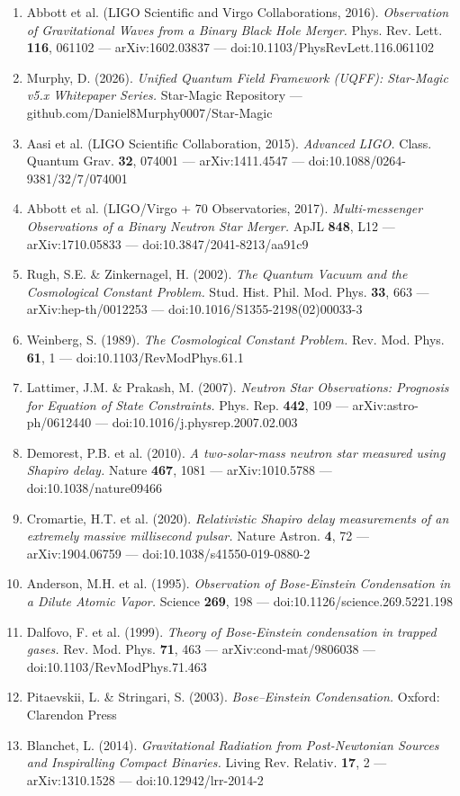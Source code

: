 \documentclass[11pt]{article}
\begin{document}
\begin{enumerate}
  \item Abbott et al. (LIGO Scientific and Virgo Collaborations, 2016). \emph{Observation of Gravitational Waves from a Binary Black Hole Merger.} Phys. Rev. Lett. \textbf{116}, 061102 --- arXiv:1602.03837 --- doi:10.1103/PhysRevLett.116.061102
  \item Murphy, D. (2026). \emph{Unified Quantum Field Framework (UQFF): Star-Magic v5.x Whitepaper Series.} Star-Magic Repository --- github.com/Daniel8Murphy0007/Star-Magic
  \item Aasi et al. (LIGO Scientific Collaboration, 2015). \emph{Advanced LIGO.} Class. Quantum Grav. \textbf{32}, 074001 --- arXiv:1411.4547 --- doi:10.1088/0264-9381/32/7/074001
  \item Abbott et al. (LIGO/Virgo + 70 Observatories, 2017). \emph{Multi-messenger Observations of a Binary Neutron Star Merger.} ApJL \textbf{848}, L12 --- arXiv:1710.05833 --- doi:10.3847/2041-8213/aa91c9
  \item Rugh, S.E. \& Zinkernagel, H. (2002). \emph{The Quantum Vacuum and the Cosmological Constant Problem.} Stud. Hist. Phil. Mod. Phys. \textbf{33}, 663 --- arXiv:hep-th/0012253 --- doi:10.1016/S1355-2198(02)00033-3
  \item Weinberg, S. (1989). \emph{The Cosmological Constant Problem.} Rev. Mod. Phys. \textbf{61}, 1 --- doi:10.1103/RevModPhys.61.1
  \item Lattimer, J.M. \& Prakash, M. (2007). \emph{Neutron Star Observations: Prognosis for Equation of State Constraints.} Phys. Rep. \textbf{442}, 109 --- arXiv:astro-ph/0612440 --- doi:10.1016/j.physrep.2007.02.003
  \item Demorest, P.B. et al. (2010). \emph{A two-solar-mass neutron star measured using Shapiro delay.} Nature \textbf{467}, 1081 --- arXiv:1010.5788 --- doi:10.1038/nature09466
  \item Cromartie, H.T. et al. (2020). \emph{Relativistic Shapiro delay measurements of an extremely massive millisecond pulsar.} Nature Astron. \textbf{4}, 72 --- arXiv:1904.06759 --- doi:10.1038/s41550-019-0880-2
  \item Anderson, M.H. et al. (1995). \emph{Observation of Bose-Einstein Condensation in a Dilute Atomic Vapor.} Science \textbf{269}, 198 --- doi:10.1126/science.269.5221.198
  \item Dalfovo, F. et al. (1999). \emph{Theory of Bose-Einstein condensation in trapped gases.} Rev. Mod. Phys. \textbf{71}, 463 --- arXiv:cond-mat/9806038 --- doi:10.1103/RevModPhys.71.463
  \item Pitaevskii, L. \& Stringari, S. (2003). \emph{Bose--Einstein Condensation.} Oxford: Clarendon Press
  \item Blanchet, L. (2014). \emph{Gravitational Radiation from Post-Newtonian Sources and Inspiralling Compact Binaries.} Living Rev. Relativ. \textbf{17}, 2 --- arXiv:1310.1528 --- doi:10.12942/lrr-2014-2
\end{enumerate}


\end{document}
